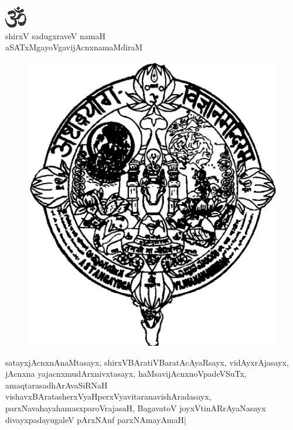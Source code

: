 \newpage

\begin{center}
{\includegraphics[scale=1]{om.eps}}\\[5pt]

{\normalsize shirxV sadugxraveV namaH }\\[5pt]

{\large aSATxMgayoVgavijAcnxnamaMdiraM}
\end{center}

\vskip -20pt

\begin{figure}[h]
\centerline
{\includegraphics[scale=.18]{0000d.eps}}
\end{figure}

satayxjAcnxnAnaMtasayx, shirxVBAratiVBaratAcAyaRsayx, vidAyxrAjasayx, jAcnxna yajacnxmudArxnivxtasayx, haMsavijAcnxnoVpadeVSuTx, amaqtarasadhArAvaSiRNaH vishavxBAratasherxVyaHperxVyavitaranavishAradasayx, parxNavahayahamasxparoVrajasaH, BagavatoV joyxVtinARrAyaNasayx divayxpadayugaleV pArxNAnf parxNAmayAmaH|

